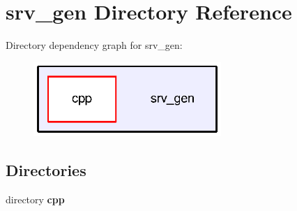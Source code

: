 \section{srv\-\_\-gen Directory Reference}
\label{dir_f3fe9781c4357b5ef4cc83e260ab777c}
Directory dependency graph for srv\-\_\-gen\-:\nopagebreak
\begin{figure}[H]
\begin{center}
\leavevmode
\includegraphics[width=202pt]{dir_f3fe9781c4357b5ef4cc83e260ab777c_dep}
\end{center}
\end{figure}
\subsection*{Directories}
\begin{DoxyCompactItemize}
\item 
directory {\bf cpp}
\end{DoxyCompactItemize}
